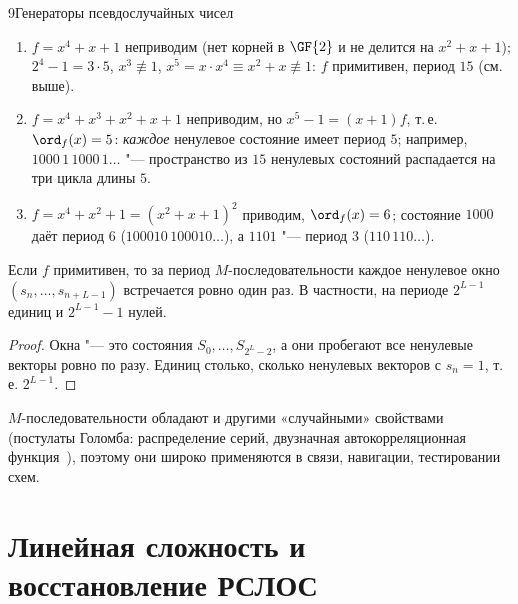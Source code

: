 \begin{lecture}{9}{Генераторы псевдослучайных чисел}
\begin{example}
\begin{enumerate}
  \item $f = x^4 + x + 1$ неприводим (нет корней в $\GF{2}$ и не делится на $x^2 + x + 1$);
    $2^4 - 1 = 3 \cdot 5$, $x^3 \not\equiv 1$, $x^5 = x \cdot x^4 \equiv x^2 + x \not\equiv 1$:
    $f$ примитивен, период $15$ (см. выше).
  \item $f = x^4 + x^3 + x^2 + x + 1$ неприводим, но $x^5 - 1 = (x + 1) f$, т.\,е.
    $\ord_f(x) = 5$: \emph{каждое} ненулевое состояние имеет период $5$; например,
    $1000\,1\,1000\,1\dots$ "--- пространство из $15$ ненулевых состояний распадается на три цикла
    длины $5$.
  \item $f = x^4 + x^2 + 1 = (x^2 + x + 1)^2$ приводим, $\ord_f(x) = 6$; состояние $1000$ даёт
    период $6$ ($100010\,100010\dots$), а $1101$ "--- период $3$ ($110\,110\dots$).
\end{enumerate}
\end{example}

\begin{proposition}\label{l9:windows}
Если $f$ примитивен, то за период $M$-последовательности каждое ненулевое окно
$(s_n, \dots, s_{n+L-1})$ встречается ровно один раз. В частности, на периоде $2^{L-1}$ единиц и
$2^{L-1} - 1$ нулей.
\end{proposition}

\begin{proof}
Окна "--- это состояния $S_0, \dots, S_{2^L - 2}$, а они пробегают все ненулевые векторы ровно по
разу. Единиц столько, сколько ненулевых векторов с $s_n = 1$, т.\,е. $2^{L-1}$.
\end{proof}

$M$-последовательности обладают и другими «случайными» свойствами (постулаты Голомба:
распределение серий, двузначная автокорреляционная функция~\cite{golomb}), поэтому они широко
применяются в связи, навигации, тестировании схем.



\section{Линейная сложность и восстановление РСЛОС}


\end{lecture}

